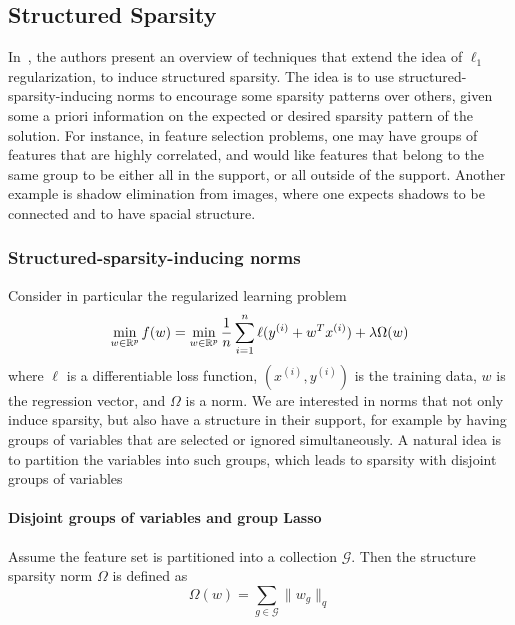 \subsection{Structured Sparsity}
In~\cite{Bach:2011kx}, the authors present an overview of techniques that extend the idea of $\ell_1$ regularization, to induce structured sparsity. The idea is to use structured-sparsity-inducing norms to encourage some sparsity patterns over others, given some a priori information on the expected or desired sparsity pattern of the solution. For instance, in feature selection problems, one may have groups of features that are highly correlated, and would like features that belong to the same group to be either all in the support, or all outside of the support. Another example is shadow elimination from images, where one expects shadows to be connected and to have spacial structure.


\subsubsection{Structured-sparsity-inducing norms}
Consider in particular the regularized learning problem
\begin{equation}
\label{eq:struct_spars}
\min_{w \in {\mathbb R}^p} f(w) = \min_{w \in {\mathbb R}^p} \frac{1}{n} \sum_{i = 1}^n \ell(y^{(i)} + w^Tx^{(i)}) + \lambda \Omega(w)
\end{equation}
where $\ell$ is a differentiable loss function, $(x^{(i)}, y^{(i)})$ is the training data, $w$ is the regression vector, and $\Omega$ is a norm. We are interested in norms that not only induce sparsity, but also have a structure in their support, for example by having groups of variables that are selected or ignored simultaneously. A natural idea is to partition the variables into such groups, which leads to sparsity with disjoint groups of variables

\paragraph{Disjoint groups of variables and group Lasso}
Assume the feature set is partitioned into a collection $\mathcal{G}$. Then the structure sparsity norm $\Omega$ is defined as
\[
\Omega(w)  = \sum_{g \in \mathcal{G}} \|w_g\|_q
\]

